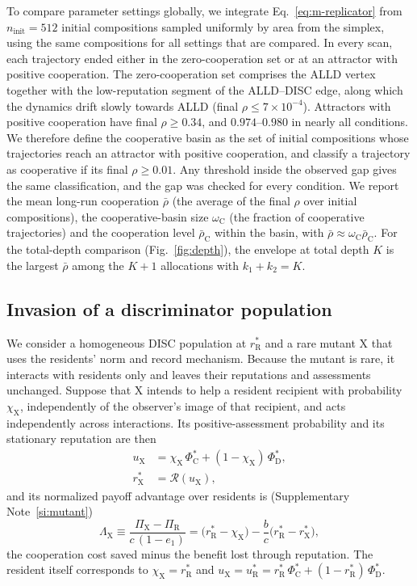 \documentclass[10pt]{wlscirep}
\newcommand{\Rmap}{\mathscr{R}}            %
\newcommand{\rR}{r_{\mathrm{R}}^{*}}
\newcommand{\uR}{u_{\mathrm{R}}^{*}}
\newcommand{\rX}{r_{\mathrm{X}}^{*}}
\newcommand{\uX}{u_{\mathrm{X}}}
\newcommand{\PhiCs}{\Phi^{*}_{\mathrm{C}}}
\newcommand{\PhiDs}{\Phi^{*}_{\mathrm{D}}}
\theoremstyle{plain}
\theoremstyle{remark}
\begin{document}
To compare parameter settings globally, we integrate Eq.~\eqref{eq:m-replicator} from $n_{\mathrm{init}}=512$ initial compositions sampled uniformly by area from the simplex, using the same compositions for all settings that are compared. In every scan, each trajectory ended either in the zero-cooperation set or at an attractor with positive cooperation. The zero-cooperation set comprises the ALLD vertex together with the low-reputation segment of the ALLD--DISC edge, along which the dynamics drift slowly towards ALLD (final $\rho\leq7\times10^{-4}$). Attractors with positive cooperation have final $\rho\geq0.34$, and $0.974$--$0.980$ in nearly all conditions. We therefore define the cooperative basin as the set of initial compositions whose trajectories reach an attractor with positive cooperation, and classify a trajectory as cooperative if its final $\rho\geq0.01$. Any threshold inside the observed gap gives the same classification, and the gap was checked for every condition. We report the mean long-run cooperation $\bar\rho$ (the average of the final $\rho$ over initial compositions), the cooperative-basin size $\omega_{\mathrm C}$ (the fraction of cooperative trajectories) and the cooperation level $\bar\rho_{\mathrm C}$ within the basin, with $\bar\rho\approx\omega_{\mathrm C}\bar\rho_{\mathrm C}$. For the total-depth comparison (Fig.~\ref{fig:depth}), the envelope at total depth $K$ is the largest $\bar\rho$ among the $K+1$ allocations with $k_1+k_2=K$.

\subsection*{Invasion of a discriminator population}

We consider a homogeneous DISC population at $\rR$ and a rare mutant X that uses the residents' norm and record mechanism. Because the mutant is rare, it interacts with residents only and leaves their reputations and assessments unchanged. Suppose that X intends to help a resident recipient with probability $\chi_{\mathrm X}$, independently of the observer's image of that recipient, and acts independently across interactions. Its positive-assessment probability and its stationary reputation are then
\begin{equation}
\begin{aligned}
\uX&=\chi_{\mathrm X}\,\PhiCs+(1-\chi_{\mathrm X})\,\PhiDs,\\
\rX&=\Rmap(\uX),
\end{aligned}
\label{eq:m-mutant-u}
\end{equation}
and its normalized payoff advantage over residents is (Supplementary Note~\ref{si:mutant})
\begin{equation}
\Lambda_{\mathrm X}\equiv\frac{\Pi_{\mathrm X}-\Pi_{\mathrm R}}{c\,(1-e_1)}
=\bigl(\rR-\chi_{\mathrm X}\bigr)-\frac{b}{c}\bigl(\rR-\rX\bigr),
\label{eq:m-mutant}
\end{equation}
the cooperation cost saved minus the benefit lost through reputation. The resident itself corresponds to $\chi_{\mathrm X}=\rR$ and $\uX=\uR=\rR\,\PhiCs+(1-\rR)\,\PhiDs$.
\end{document}
